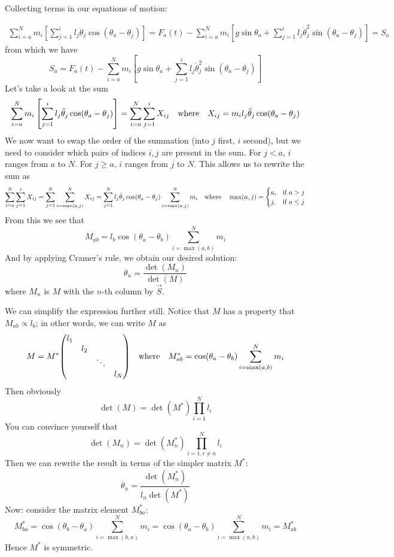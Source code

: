 \documentclass[12pt]{article}
\begin{document}
	Collecting terms in our equations of motion:
	
	\begin{eqnarray*}
	\sum_{i=a}^N m_i\left[\sum_{j=1}^il_j\ddot{\theta}_j\cos(\theta_a-\theta_j) \right]=F_a(t)-\sum_{i=a}^N m_i\left[g \sin{\theta_a} + \sum_{j=1}^il_j \dot{\theta}_j^2 \sin(\theta_a-\theta_j) \right] = S_a
	\end{eqnarray*}
	from which we have
	$$S_a = F_a(t)-\sum_{i=a}^N m_i\left[g \sin{\theta_a} + \sum_{j=1}^il_j \dot{\theta}_j^2 \sin(\theta_a-\theta_j) \right]$$
	Let's take a look at the sum
	$$\sum_{i=a}^N m_i\left[\sum_{j=1}^il_j\ddot{\theta}_j\cos(\theta_a-\theta_j) \right]=\sum_{i=a}^N \sum_{j=1}^i X_{ij}\qq{where} X_{ij}=m_il_j\ddot{\theta}_j\cos(\theta_a-\theta_j)$$
	We now want to swap the order of the summation (into $j$ first, $i$ second), but we need to consider which pairs of indices $i,j$ are present in the sum. For $j<a$, $i$ ranges from $a$ to $N$. For $j\geq a$, $i$ ranges from $j$ to $N$. This allows us to rewrite the sum as
	\begin{eqnarray*}
	\sum_{i=a}^N \sum_{j=1}^i X_{ij}=\sum_{j=1}^N \sum_{i=\max(a,j)}^N X_{ij}=\sum_{j=1}^N l_j\ddot{\theta}_j\cos(\theta_a-\theta_j)\sum_{i=\max(a,j)}^N m_i \qq{where} \max(a,j)=\begin{cases}
			a, & \text{if $a>j$}\\
      j, & \text{if $a\leq j$}
		 \end{cases}
	\end{eqnarray*}
	From this we see that
	$$M_{ab}=l_b\cos(\theta_a-\theta_b)\sum_{i=\max(a,b)}^N m_i$$
	And by applying Cramer's rule, we obtain our desired solution:
	$$\ddot{\theta}_n=\frac{\det(M_n)}{\det(M)}$$
	where $M_n$ is $M$ with the $n$-th column by $\vec{S}$.
	
	We can simplify the expression further still. Notice that $M$ has a property that $M_{ab}\propto l_b$; in other words, we can write $M$ as
	$$M=M^*\mqty(\dmat{l_1,l_2,\ddots, l_N})\qq{where} M_{ab}^*=\cos(\theta_a-\theta_b)\sum_{i=\max(a,b)}^N m_i$$
	Then obviously
	$$\det(M)=\det(M^*)\prod_{i=1}^Nl_i$$
	You can convince yourself that
	$$\det(M_n)=\det(M_n^*)\prod_{i=1,i\neq n}^Nl_i$$
	Then we can rewrite the result in terms of the simpler matrix $M^*$:
	$$\ddot{\theta}_n=\frac{\det(M_n^*)}{l_n\det(M^*)}$$
	Now: consider the matrix element $M_{ba}^*$:
	$$M_{ba}^*=\cos(\theta_b-\theta_a)\sum_{i=\max(b,a)}^N m_i=\cos(\theta_a-\theta_b)\sum_{i=\max(a,b)}^N m_i=M_{ab}^*$$
	Hence $M^*$ is symmetric.
	
\end{document}
